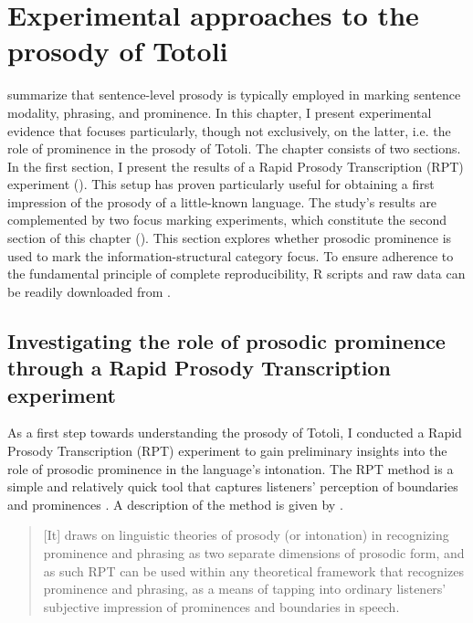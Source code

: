 \chapter[Experimental approaches]{Experimental approaches to the prosody of Totoli}
\label{sec:Experiments}


\citet[250]{himmelmann2008prosodic}  summarize that sentence-level prosody  is typically employed in marking sentence modality,  phrasing,  and prominence.  In this chapter, I present experimental evidence that focuses particularly, though not exclusively, on the latter, i.e. the role of prominence  in the prosody of Totoli. The chapter consists of two sections. In the first section, I present the results of a Rapid Prosody Transcription (RPT)  experiment (). This setup has proven particularly useful for obtaining a first impression of the prosody of a little-known language. The study's results are complemented by two focus marking  experiments, which constitute the second section of this chapter (). This section explores whether prosodic prominence is used to mark the information-structural category focus.  To ensure adherence to the fundamental principle of complete reproducibility,  R scripts and raw data can be readily downloaded from \citet{OSF}. 


\section[Rapid Prosody Transcription experiment]{Investigating the role of prosodic prominence through a Rapid Prosody Transcription experiment}
\label{sec:RPT}


As a first step towards understanding the prosody of Totoli, I conducted a Rapid Prosody Transcription (RPT) experiment to gain preliminary insights into the role of prosodic prominence in the language's intonation. The RPT method is a simple and relatively quick tool that captures listeners' perception of boundaries and prominences \citep{mo2008naive, cole2014listening}.
A description of the method is given by  \citet[11]{Cole2016}.

\begin{quotation}
	[It] draws on linguistic theories of prosody (or intonation) in recognizing prominence and phrasing as two separate dimensions of prosodic form, and as such RPT can be used within any theoretical framework that recognizes prominence and phrasing, as a means of tapping into ordinary listeners’ subjective impression of prominences and boundaries in speech.  
\end{quotation}

